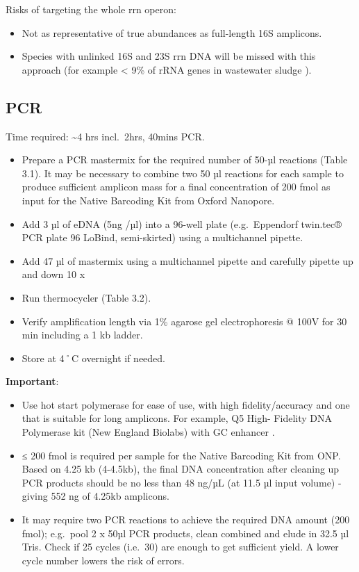 \documentclass[
]{book}
\providecommand{\tightlist}{%
  \setlength{\itemsep}{0pt}\setlength{\parskip}{0pt}}
\begin{document}
Risks of targeting the whole rrn operon:

\begin{itemize}
\tightlist
\item
  Not as representative of true abundances as full-length 16S amplicons.
\item
  Species with unlinked 16S and 23S rrn DNA will be missed with this approach (for example \textless{} 9\% of rRNA genes in wastewater sludge \citep{Brewer2020}).
\end{itemize}

\subsection{PCR}\label{pcr}

Time required: \textasciitilde4 hrs incl.~2hrs, 40mins PCR.

\begin{itemize}
\tightlist
\item
  Prepare a PCR mastermix for the required number of 50-µl reactions (Table 3.1). It may be necessary to combine two 50 µl reactions for each sample to produce sufficient amplicon mass for a final concentration of 200 fmol as input for the Native Barcoding Kit from Oxford Nanopore.
\item
  Add 3 µl of eDNA (5ng /µl) into a 96-well plate (e.g.~Eppendorf twin.tec® PCR plate 96 LoBind, semi-skirted) using a multichannel pipette.
\item
  Add 47 µl of mastermix using a multichannel pipette and carefully pipette up and down 10 x
\item
  Run thermocycler (Table 3.2).
\item
  Verify amplification length via 1\% agarose gel electrophoresis @ 100V for 30 min including a 1 kb ladder.
\item
  Store at 4˚C overnight if needed.
\end{itemize}

\textbf{Important}:

\begin{itemize}
\item
  Use hot start polymerase for ease of use, with high fidelity/accuracy and one that is suitable for long amplicons. For example, Q5 High- Fidelity DNA Polymerase kit (New England Biolabs) with GC enhancer \citep{Martijn2019}.
\item
  ≤ 200 fmol is required per sample for the Native Barcoding Kit from ONP. Based on 4.25 kb (4-4.5kb), the final DNA concentration after cleaning up PCR products should be no less than 48 ng/µL (at 11.5 µl input volume) - giving 552 ng of 4.25kb amplicons.
\item
  It may require two PCR reactions to achieve the required DNA amount (200 fmol); e.g.~pool 2 x 50µl PCR products, clean combined and elude in 32.5 µl Tris. Check if 25 cycles (i.e.~30) are enough to get sufficient yield. A lower cycle number lowers the risk of errors.

  ~ ~
\end{itemize}
\end{document}
